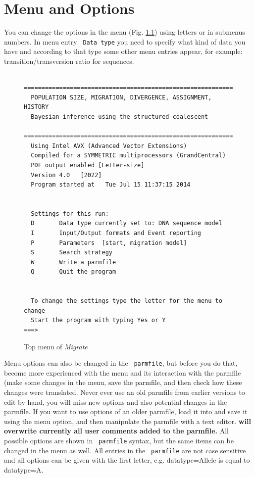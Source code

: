 \chapter {Menu and Options}
You can change the options in the menu (Fig. \ref{TOPM}) using letters or in submenus numbers. 
In menu entry \texttt{ Data type} you need to specify what kind of data you have and according
to that type some other menu entries appear, for example:  transition/transversion ratio for sequences.\\

\begin{figure}[bht]

\begin{center}

\begin{boxedminipage}[t]{5.2in}
\begin{small}
\begin{verbatim}
 ===========================================================
  POPULATION SIZE, MIGRATION, DIVERGENCE, ASSIGNMENT, HISTORY
  Bayesian inference using the structured coalescent
  ===========================================================
  Using Intel AVX (Advanced Vector Extensions)
  Compiled for a SYMMETRIC multiprocessors (GrandCentral)
  PDF output enabled [Letter-size]
  Version 4.0   [2022]
  Program started at   Tue Jul 15 11:37:15 2014


  Settings for this run:
  D       Data type currently set to: DNA sequence model            
  I       Input/Output formats and Event reporting
  P       Parameters  [start, migration model]
  S       Search strategy
  W       Write a parmfile
  Q       Quit the program


  To change the settings type the letter for the menu to change
  Start the program with typing Yes or Y
===> 
\end{verbatim}
\end{small}
\end{boxedminipage}
\end{center}
\caption{\textsf{ Top menu of \textit{ Migrate}}}
\label{TOPM}
\end{figure}
Menu options can also be changed in the \texttt{ parmfile}, but before you do that, become more experienced with the
menu and its interaction with the parmfile (make some changes in the menu, save the parmfile, and then check
how these changes were translated. Never ever use an old parmfile from earlier versions to edit by hand, you will miss
new options and also potential changes in the parmfile. If you want to use options of an older parmfile, load it into \migrate
and save it using the menu option, and then manipulate the parmfile with a text editor. \textbf{\migrate will overwrite currently all
user comments added to the parmfile.}
All possible options are shown in \texttt{ parmfile} syntax, but the same items can 
be changed in the menu as well. All entries in the \texttt{ parmfile} 
are not case sensitive and all options
can be given with the first letter, e.g. datatype=Allele is equal to 
datatype=A. 
\newpage
